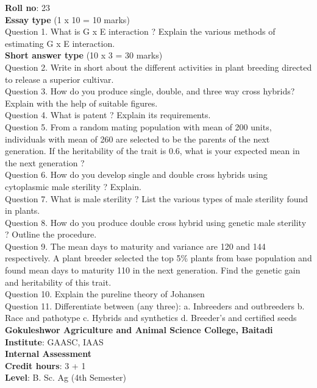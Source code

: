 \documentclass[12pt]{article}\usepackage[]{graphicx}\usepackage[]{color}
\begin{document}
\textbf{Roll no}: 23 \\[0.5cm] 
\textbf{Essay type} (1 x 10 = 10 marks) \\
Question 1. What is G x E interaction ? Explain the various methods of estimating G x E interaction.\\
\textbf{Short answer type} (10 x 3 = 30 marks) \\
Question 2. Write in short about the different activities in plant breeding directed to release a superior cultivar.\\
Question 3. How do you produce single, double, and three way cross hybrids? Explain with the help of suitable figures.\\
Question 4. What is patent ? Explain its requirements.\\
Question 5. From a random mating population with mean of 200 units, individuals with mean of 260 are selected to be the parents of the next generation. If the heritability of the trait is 0.6, what is your expected mean in the next generation ?\\
Question 6. How do you develop single and double cross hybrids using cytoplasmic male sterility ? Explain.\\
Question 7. What is male sterility ? List the various types of male sterility found in plants.\\
Question 8. How do you produce double cross hybrid using genetic male sterility ? Outline the procedure.\\
Question 9. The mean days to maturity and variance are 120 and 144 respectively. A plant breeder selected the top 5\% plants from base population and found mean days to maturity 110 in the next generation. Find the genetic gain and heritability of this trait.\\
Question 10. Explain the pureline theory of Johansen\\
Question 11. Differentiate between (any three): a. Inbreeders and outbreeders b. Race and pathotype c. Hybrids and synthetics d. Breeder's and certified seeds\\
\clearpage 
{\centering \Large{\textbf{Gokuleshwor Agriculture and Animal Science College, Baitadi}} \\[0.25cm]
            \textbf{Institute}: GAASC, IAAS \\[0.2cm]
            \textbf{Internal Assessment} \\[0.2cm]} 
\textbf{Credit hours}: 3 + 1 \\ 
\textbf{Level}: B. Sc. Ag (4th Semester) \\
\end{document}
